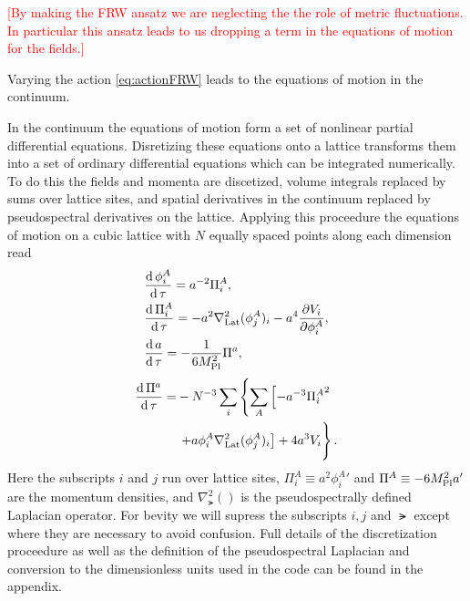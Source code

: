 \textcolor{red}{[By making the FRW ansatz we are neglecting the the role of metric fluctuations. In particular this ansatz leads to us dropping a term in the equations of motion for the fields.]}

Varying the action \eqref{eq:actionFRW} leads to the equations of motion in the continuum.

In the continuum the equations of motion form a set of nonlinear partial differential equations. Disretizing these equations onto a lattice transforms them into a set of ordinary differential equations which can be integrated numerically. To do this the fields and momenta are discetized, volume integrals replaced by sums over lattice sites, and spatial derivatives in the continuum replaced by pseudospectral derivatives on the lattice. Applying this proceedure the equations of motion on a cubic lattice with $N$ equally spaced points along each dimension read
\begin{align}
  & \frac{\mathrm{d}\,\phi^A_i}{\mathrm{d}\,\tau} = a^{-2}\Pi^A_i,  \label{eq:lat eom a}\\
  & \frac{\mathrm{d}\,\Pi^A_i}{\mathrm{d}\,\tau} = -a^2\nabla^2_{\mathrm{Lat}}(\phi^A_j)_i -a^4\frac{\partial V_i}{\partial \phi^A_i},  \label{eq:lat eom pi a}\\
  & \frac{\mathrm{d}\, a}{\mathrm{d}\,\tau} = -\frac{1}{6M_{\mathrm{Pl}}^2}\Pi^a,  \label{eq:lat eom phi}
\end{align}
\begin{align}
  \begin{split}
    \frac{\dd\Pi^a}{\dd\tau} = &-N^{-3}\sum_i\left\{
    \sum_A\left[-a^{-3}{\Pi^A_i}^2 \right.\right. \\
    &  \left.\left. + a\phi^A_i\nabla^2_\lat(\phi^A_j)_i \right]%
    + 4a^3V_i\vphantom{\sum_A}\right\}.
  \end{split} \label{eq:lat eom pi phi}  
\end{align}
Here the subscripts $i$ and $j$ run over lattice sites, $\Pi^A_i \equiv a^2{\phi^A_i}'$ and $\Pi^A \equiv -6M_{\mathrm{Pl}}^2a'$ are the momentum densities, and $\nabla^2_\lat()$ is the pseudospectrally defined Laplacian operator.
For bevity we will supress the subscripts $i,j$ and $\lat$ except where they are necessary to avoid confusion.
Full details of the discretization proceedure as well as the definition of the pseudospectral Laplacian and conversion to the dimensionless units used in the code can be found in the appendix.

